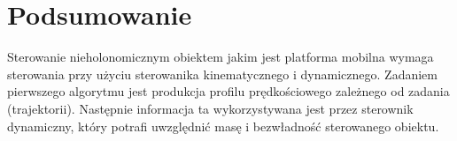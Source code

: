 \documentclass[12pt,a4paper]{article}
\begin{document}
\section{Podsumowanie}

  Sterowanie nieholonomicznym obiektem jakim jest platforma mobilna wymaga sterowania przy użyciu sterowanika kinematycznego i dynamicznego. Zadaniem pierwszego algorytmu jest produkcja profilu prędkościowego zależnego od zadania (trajektorii). Następnie informacja ta wykorzystywana jest przez sterownik dynamiczny, który potrafi uwzględnić masę i bezwładność sterowanego obiektu.
\end{document}
